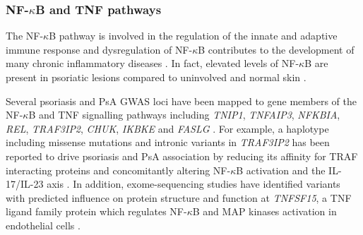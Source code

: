 \subsubsection*{NF-$\kappa$B and TNF pathways}

The NF-$\kappa$B pathway is involved in the regulation of the innate and adaptive immune response and dysregulation of NF-$\kappa$B contributes to the development of many chronic inflammatory diseases \parencite{Liu2017}. In fact, elevated levels of NF-$\kappa$B are present in psoriatic lesions compared to uninvolved and normal skin \parencite{Lizzul2005}. 

Several psoriasis and PsA GWAS loci have been mapped to gene members of the NF-$\kappa$B and TNF signalling pathways including \textit{TNIP1}, \textit{TNFAIP3}, \textit{NFKBIA}, \textit{REL}, \textit{TRAF3IP2}, \textit{CHUK}, \textit{IKBKE} and \textit{FASLG} \parencite{Nair2008, Ellinghaus2010, Huffmeier2010, Wang2008, Idel2003, Bowes2012, Tsoi2017}. 
For example, a haplotype including missense mutations and intronic variants in \textit{TRAF3IP2} has been reported to drive psoriasis and PsA association by reducing its affinity for TRAF interacting proteins and concomitantly altering NF-$\kappa$B activation and the IL-17/IL-23 axis \parencite{Huffmeier2010, Ellinghaus2010}. In addition, exome-sequencing studies have identified variants with predicted influence on protein structure and function at \textit{TNFSF15}, a TNF ligand family protein which regulates NF-$\kappa$B and MAP kinases activation in endothelial cells \parencite{Dand2017, Wang2014}.


